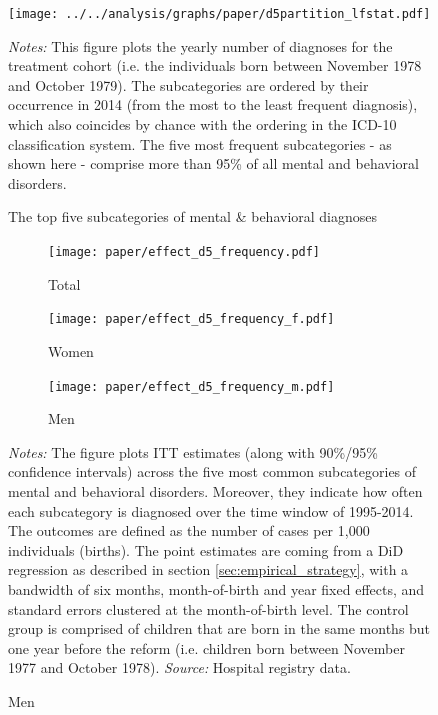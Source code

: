 \documentclass[11pt, a4paper,draft]{article} %
\begin{document}
 
\vspace*{\fill}
\begin{figure}[H]\centering
	\caption{The top five subcategories of mental \& behavioral diagnoses}\label{fig: d5partition}
	\texttt{[image: ../../analysis/graphs/paper/d5partition\_lfstat.pdf]}
	\scriptsize
	\begin{minipage}{0.9\linewidth}
	\emph{Notes:} This figure plots the yearly number of diagnoses for the treatment cohort (i.e. the individuals born between November 1978 and October 1979). The subcategories are ordered by their occurrence in 2014 (from the most to the least frequent diagnosis), which also coincides by chance with the ordering in the ICD-10 classification system. The five most frequent subcategories - as shown here - comprise more than 95\% of all mental and behavioral disorders. 
	\end{minipage}
\end{figure}
\vspace*{\fill}\clearpage%
\begin{landscape}
	\vspace*{\fill}
	\begin{figure}
		[H]\centering
		\caption{ITT effect for \textbf{subcategories of mental \& behavioral disorders (pooled)}}\label{fig: ITT_d5_subcategories}
		\begin{subfigure}[h]{0.31\linewidth}\centering\caption{Total}
			\texttt{[image: paper/effect\_d5\_frequency.pdf]}
		\end{subfigure}
		\begin{subfigure}[h]{0.31\linewidth}\centering\caption{Women}
			\texttt{[image: paper/effect\_d5\_frequency\_f.pdf]}
		\end{subfigure}
		\begin{subfigure}[h]{0.31\linewidth}\centering\caption{Men}
			\texttt{[image: paper/effect\_d5\_frequency\_m.pdf]}
		\end{subfigure}
		\scriptsize
		\begin{minipage}{0.95\linewidth}
			\emph{Notes:} The figure plots ITT estimates (along with 90\%/95\% confidence intervals) across the five most common subcategories of mental and behavioral disorders. Moreover, they indicate how often each subcategory is diagnosed over the time window of 1995-2014. The outcomes are defined as the number of cases per 1,000 individuals (births). The point estimates are coming from a DiD regression as described in section \ref{sec:empirical_strategy}, with a bandwidth of six months, month-of-birth and year fixed effects, and standard errors clustered at the month-of-birth level. The control group is comprised of children that are born in the same months but one year before the reform (i.e. children born between November 1977 and October 1978).\newline
			\emph{Source:} Hospital registry data.
		\end{minipage}
	\end{figure}
	\vspace*{\fill}\clearpage
\end{landscape}
\end{document}
